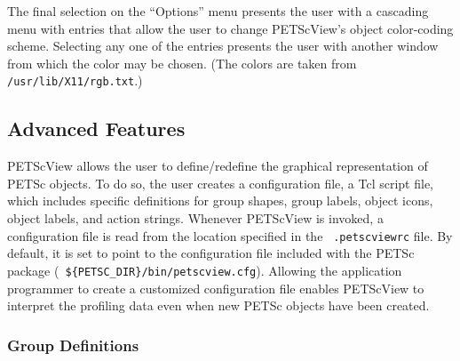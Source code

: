 The final selection on the ``Options'' menu presents the user with a
cascading menu with entries that allow the user to change PETScView's
object color-coding scheme.  Selecting any one of the
entries presents the user with another window from which the color may
be chosen.  (The colors are taken from {\tt /usr/lib/X11/rgb.txt}.)

\subsection{Advanced Features}
\label{sec:petscview_advanced}

PETScView allows the user to define/redefine the graphical
representation of PETSc objects.  To do so, the user creates a
configuration file, a Tcl script file, which includes specific
definitions for group shapes, group labels, object icons, object
labels, and action strings.  Whenever PETScView is invoked, a
configuration file is read from the location specified in the {\tt
.petscviewrc} file.  By default, it is set to point to the
configuration file included with the PETSc package ({\tt
\$\{PETSC\_DIR\}/bin/petscview.cfg}).  Allowing the application programmer
to create a customized configuration file enables PETScView to
interpret the profiling data even when new PETSc objects have been
created.

\subsubsection{Group Definitions}


